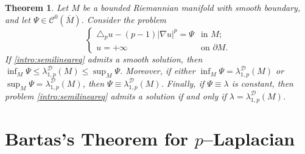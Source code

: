 \documentclass{article}
\newtheorem{theorem}{Theorem}[section]
\begin{document}
\begin{theorem}\label{Thm:pKazdame}
Let $M$ be a bounded Riemannian manifold with smooth boundary, and let 
$\Psi \in \mathcal{C}^0(\overline{M})$. Consider the problem
\begin{equation}\label{intro:semilineareq}
\begin{cases}
\triangle_p u - (p-1)|\nabla u|^p = \Psi & \text{in } M;\\
u = +\infty & \text{on } \partial M.
\end{cases}
\end{equation}
If \eqref{intro:semilineareq} admits a smooth solution, then $\inf_M \Psi \leq \lambda_{1,p}^{\mathcal{D}}(M) \leq \sup_M \Psi$. Moreover, if either $\inf_M \Psi = \lambda_{1,p}^{\mathcal{D}}(M)$ or $\sup_M \Psi = \lambda_{1,p}^{\mathcal{D}}(M)$, then $\Psi \equiv \lambda_{1,p}^{\mathcal{D}}(M)$. Finally, if $\Psi \equiv \lambda$ is constant, then problem \eqref{intro:semilineareq} admits a solution if and only if $\lambda = \lambda_{1,p}^{\mathcal{D}}(M)$.
\end{theorem}

\section{Bartas’s Theorem for \texorpdfstring{\(p\)--}aLaplacian}
\end{document}

